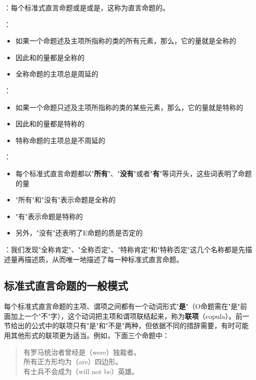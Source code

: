 \begin{theorembox}[title=直言命题的量]
：每个标准式直言命题或是或是，这称为直言命题的。

：
\begin{itemize}
  \item 如果一个命题述及主项所指称的类的所有元素，那么，它的量就是全称的
  \item 因此和的量都是全称的
  \item 全称命题的主项总是周延的
\end{itemize}

：
\begin{itemize}
  \item 如果一个命题只述及主项所指称的类的某些元素，那么，它的量就是特称的
  \item 因此和的量都是特称的
  \item 特称命题的主项总是不周延的
\end{itemize}

：
\begin{itemize}
  \item 每个标准式直言命题都以"\textbf{所有}"、"\textbf{没有}"或者"\textbf{有}"等词开头，这些词表明了命题的量
  \item "所有"和"没有"表示命题是全称的
  \item "有"表示命题是特称的
  \item 另外，"没有"还表明了E命题的质是否定的
\end{itemize}

：我们发现"全称肯定"、"全称否定"、"特称肯定"和"特称否定"这几个名称都是先描述量再描述质，从而唯一地描述了每一种标准式直言命题。
\end{theorembox}

\subsection{标准式直言命题的一般模式}
每个标准式直言命题的主项、谓项之间都有一个动词形式"\textbf{是}"（O命题需在"是"前面加上一个"不"字），这个动词把主项和谓项联结起来，称为\textbf{联项}（copula）。前一节给出的公式中的联项只有"是"和"不是"两种，但依据不同的措辞需要，有时可能用其他形式的联项更为适当。例如，下面三个命题中：

\begin{quote}
有罗马统治者曾经是（were）独裁者。\\
所有正方形均为（are）四边形。\\
有士兵不会成为（will not be）英雄。
\end{quote}

